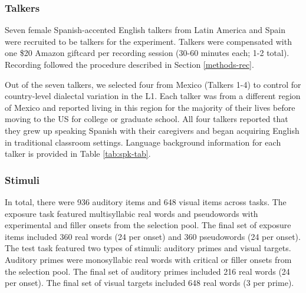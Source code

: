 \documentclass[preprint, 3p, authoryear]{elsarticle} %
\begin{document}
\hypertarget{methods-talk-1a}{%
\subsubsection{Talkers}\label{methods-talk-1a}}

Seven female Spanish-accented English talkers from Latin America and Spain were recruited to be talkers for the experiment.
Talkers were compensated with one \$20 Amazon giftcard per recording session (30-60 minutes each; 1-2 total).
Recording followed the procedure described in Section \ref{methods-rec}.

Out of the seven talkers, we selected four from Mexico (Talkers 1-4) to control for country-level dialectal variation in the L1.
Each talker was from a different region of Mexico and reported living in this region for the majority of their lives before moving to the US for college or graduate school.
All four talkers reported that they grew up speaking Spanish with their caregivers and began acquiring English in traditional classroom settings.
Language background information for each talker is provided in Table \ref{tab:spk-tab}.

\begin{table}

\caption{\label{tab:spk-tab}Talker background information.}
\centering
{}
\end{table}

\hypertarget{methods-stims-1a}{%
\subsubsection{Stimuli}\label{methods-stims-1a}}

In total, there were 936 auditory items and 648 visual items across tasks.
The exposure task featured multisyllabic real words and pseudowords with experimental and filler onsets from the selection pool.
The final set of exposure items included 360 real words (24 per onset) and 360 pseudowords (24 per onset).
The test task featured two types of stimuli: auditory primes and visual targets.
Auditory primes were monosyllabic real words with critical or filler onsets from the selection pool.
The final set of auditory primes included 216 real words (24 per onset).
The final set of visual targets included 648 real words (3 per prime).
\end{document}
